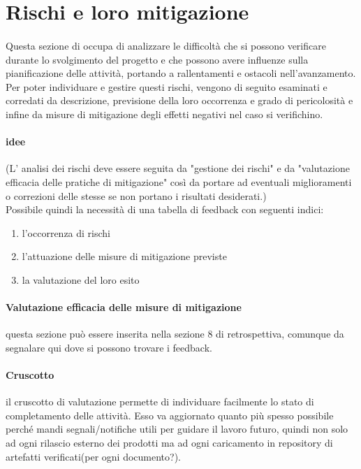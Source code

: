\documentclass[10pt, a4paper]{article}
\begin{document}
\section{Rischi e loro mitigazione}
\paragraph{}Questa sezione di occupa di analizzare le difficoltà che si possono verificare durante lo svolgimento del progetto e che possono avere influenze sulla pianificazione delle attività, portando a rallentamenti e ostacoli nell'avanzamento.\\
Per poter individuare e gestire questi rischi, vengono di seguito esaminati e corredati da descrizione, previsione della loro occorrenza e grado di pericolosità e infine da misure di mitigazione degli effetti negativi nel caso si verifichino.

\color{gray}\paragraph{ idee} (L' analisi dei rischi deve essere seguita da "gestione dei rischi" e da "valutazione efficacia delle pratiche di mitigazione" così da portare ad eventuali miglioramenti o correzioni delle stesse se non portano i risultati desiderati.)\\
Possibile quindi la necessità di una tabella di feedback con seguenti indici:
\begin{enumerate}
    \item l’occorrenza di rischi
    \item l’attuazione delle misure di mitigazione previste
    \item la valutazione del loro esito
\end{enumerate}
   
\paragraph{Valutazione efficacia delle misure di mitigazione} questa sezione può essere inserita nella sezione 8 di retrospettiva, comunque da segnalare qui dove si possono trovare i feedback.
\paragraph{Cruscotto} il cruscotto di valutazione permette di individuare
facilmente lo stato di completamento delle attività. Esso va aggiornato quanto più spesso possibile perché mandi segnali/notifiche utili per guidare il lavoro futuro, quindi non solo ad ogni rilascio esterno dei prodotti ma ad ogni caricamento in repository di artefatti verificati(per ogni documento?).\\
\color{black}
\end{document}
